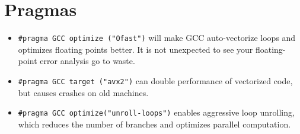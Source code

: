 \section*{Pragmas}
	\begin{itemize}
		\item \lstinline{#pragma GCC optimize ("Ofast")} will make GCC auto-vectorize loops and optimizes floating points better. 
		It is not unexpected to see your floating-point error analysis go to waste. 
		\item \lstinline{#pragma GCC target ("avx2")} can double performance of vectorized code, but causes crashes on old machines.
		\item \lstinline{#pragma GCC optimize("unroll-loops")} enables aggressive loop unrolling, which reduces the number of branches and optimizes parallel computation.
	\end{itemize}
